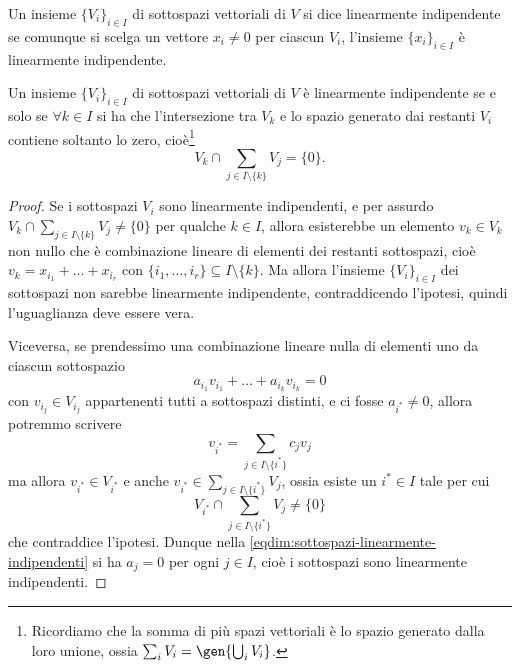 \begin{definizione} \label{d:insieme-linearmente-indipentente}
	Un insieme $\{V_i\}_{i\in I}$ di sottospazi vettoriali di $V$ si dice linearmente indipendente se comunque si scelga un vettore $x_i\neq 0$ per ciascun $V_i$, l'insieme $\{x_i\}_{i\in I}$ è linearmente indipendente.
\end{definizione}
\begin{teorema}
	Un insieme $\{V_i\}_{i\in I}$ di sottospazi vettoriali di $V$ è linearmente indipendente se e solo se $\forall k\in I$ si ha che l'intersezione tra $V_k$ e lo spazio generato dai restanti $V_i$ contiene soltanto lo zero, cioè\footnote{Ricordiamo che la somma di più spazi vettoriali è lo spazio generato dalla loro unione, ossia $\sum_i V_i=\gen{\bigcup_i V_i}$.}
	\begin{equation*}
		V_k\cap\sum_{j\in I\setminus\{k\}}{V_j}=\{0\}.
	\end{equation*}
\end{teorema}
\begin{proof}
	Se i sottospazi $V_i$ sono linearmente indipendenti, e per assurdo $V_k\cap\sum_{j\in I\setminus\{k\}}{V_j}\neq\{0\}$ per qualche $k\in I$, allora esisterebbe un elemento $v_k\in V_k$ non nullo che è combinazione lineare di elementi dei restanti sottospazi, cioè $v_k=x_{i_1}+\dots+x_{i_r}$ con $\{i_1,\dots,i_r\}\subseteq I\setminus\{k\}$.
	Ma allora l'insieme $\{V_i\}_{i\in I}$ dei sottospazi non sarebbe linearmente indipendente, contraddicendo l'ipotesi, quindi l'uguaglianza deve essere vera.

	Viceversa, se prendessimo una combinazione lineare nulla di elementi uno da ciascun sottospazio
	\begin{equation}
		a_{i_1}v_{i_1}+\dots+a_{i_k}v_{i_k}=0
		\label{eqdim:sottospazi-linearmente-indipendenti}
	\end{equation}
	con $v_{i_j}\in V_{i_j}$ appartenenti tutti a sottospazi distinti, e ci fosse $a_{i^*}\ne 0$, allora potremmo scrivere
	\begin{equation}
		v_{i^*}=\sum_{j\in I\setminus\{i^*\}}c_jv_j
	\end{equation}
	ma allora $v_{i^*}\in V_{i^*}$ e anche $v_{i^*}\in\sum_{j\in I\setminus\{i^*\}}V_j$, ossia esiste un $i^*\in I$ tale per cui
	\begin{equation*}
		V_{i^*}\cap\sum_{j\in I\setminus\{i^*\}}V_j\ne\{0\}
	\end{equation*}
	che contraddice l'ipotesi.
	Dunque nella \eqref{eqdim:sottospazi-linearmente-indipendenti} si ha $a_j=0$ per ogni $j\in I$, cioè i sottospazi sono linearmente indipendenti.
\end{proof}

